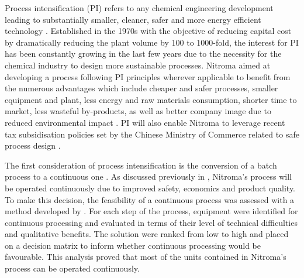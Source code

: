 Process intensification (PI) refers to any chemical engineering development leading to substantially smaller, cleaner, safer and more energy efficient technology \cite{reay_chapter_2008}. Established in the 1970s with the objective of reducing capital cost by dramatically reducing the plant volume by 100 to 1000-fold, the interest for PI has been constantly growing in the last few years due to the necessity for the chemical industry to design more sustainable processes. Nitroma aimed at developing a process following PI principles wherever applicable to benefit from the numerous advantages which include cheaper and safer processes, smaller equipment and plant, less energy and raw materials consumption, shorter time to market, less wasteful by-products, as well as better company image due to reduced environmental impact \cite{reay_chapter_2008}. PI will also enable Nitroma to leverage recent tax subsidisation policies set by the Chinese Ministry of Commerce related to safe process design \cite{nanjing_economic_and_technological_development_zone_administration_committee_public_2019}.  

The first consideration of process intensification is the conversion of a batch process to a continuous one \cite{randall_process_2020}. As discussed previously in , Nitroma's process will be operated continuously due to improved safety, economics and product quality. To make this decision, the feasibility of a continuous process was assessed with a method developed by \textcite{teoh_practical_2016}. For each step of the process, equipment were  identified for continuous processing and evaluated in terms of their level of technical difficulties and qualitative benefits. The solution were ranked from low to high and placed on a decision matrix to inform whether continuous processing would be favourable. This analysis proved that most of the units contained in Nitroma's process can be operated continuously.

